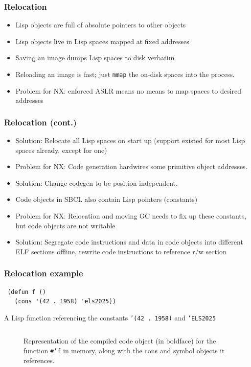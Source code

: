 \documentclass[14pt,t,aspectratio=169]{beamer}
\def\code#1{{\color{codecolor}\texttt{#1}}}
\begin{document}
\begin{frame}
  \frametitle{Relocation}
  \begin{itemize}
  \item Lisp objects are full of absolute pointers to other objects
  \item Lisp objects live in Lisp spaces mapped at fixed addresses
  \item Saving an image dumps Lisp spaces to disk verbatim
  \item Reloading an image is fast; just \texttt{mmap} the on-disk
    spaces into the process.
  \item \Rightarrow{} Problem for NX: enforced ASLR means no means to map spaces
    to desired addresses
  \end{itemize}
\end{frame}

\begin{frame}
  \frametitle{Relocation (cont.)}
  \begin{itemize}
    \item Solution: Relocate all Lisp spaces on start up (support
    existed for most Lisp spaces already, except for one)
    \item \Rightarrow{} Problem for NX: Code generation hardwires some primitive
      object addresses.
    \item Solution: Change codegen to be position independent.
    \item Code objects in SBCL also contain Lisp pointers (constants)
    \item \Rightarrow{} Problem for NX: Relocation and moving GC needs to fix up
      these constants, but code objects are not writable
    \item Solution: Segregate code instructions and data in code
      objects into different ELF sections offline, rewrite code
      instructions to reference r/w section
  \end{itemize}
\end{frame}

\begin{frame}[fragile]
  \frametitle{Relocation example}
\begin{verbatim}
 (defun f ()
   (cons '(42 . 1958) 'els2025))
\end{verbatim}
  A Lisp function referencing the constants \code{'(42 . 1958)} and \code{'ELS2025}
\end{frame}

\begin{frame}
  \begin{figure}
    \begin{columns}
      \vspace{-2em}
      \phantom{123}
      
      Representation of the compiled code object (in boldface)
      for the function \protect\texttt{\#'f} in memory, along with the
      cons and symbol objects it references.
    \end{columns}
  \end{figure}
\end{frame}
\end{document}
